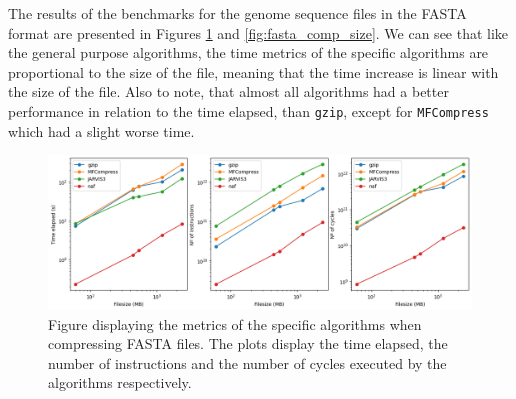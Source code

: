     The results of the benchmarks for the genome sequence files in the FASTA format are presented in Figures \ref{fig:fasta_stats} and \ref{fig:fasta_comp_size}.
    We can see that like the general purpose algorithms, the time metrics of the specific algorithms are proportional to the size of the file, meaning that the time increase is linear with the size of the file. Also to note, that almost all algorithms had a better performance in relation to the time elapsed, than \texttt{gzip}, except for \texttt{MFCompress} which had a slight worse time.
    
    \begin{figure}[h]
        \centering
        \includegraphics[width=1\textwidth]{figs/fasta_stats.png}
        \caption[Figure displaying the metrics of the specific algorithms when compressing FASTA files.] {Figure displaying the metrics of the specific algorithms when compressing FASTA files. The plots display the time elapsed, the number of instructions and the number of cycles executed by the algorithms respectively.}
        \label{fig:fasta_stats}
    \end{figure}

